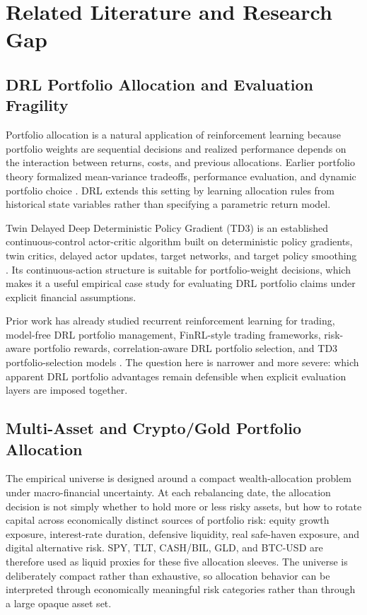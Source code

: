 \documentclass[11pt]{article}
\begin{document}
\section{Related Literature and Research Gap}

\subsection{DRL Portfolio Allocation and Evaluation Fragility}

Portfolio allocation is a natural application of reinforcement learning because portfolio weights are sequential decisions and realized performance depends on the interaction between returns, costs, and previous allocations. Earlier portfolio theory formalized mean-variance tradeoffs, performance evaluation, and dynamic portfolio choice \citep{markowitz1952,sharpe1966,merton1969,merton1971}. DRL extends this setting by learning allocation rules from historical state variables rather than specifying a parametric return model.

Twin Delayed Deep Deterministic Policy Gradient (TD3) is an established continuous-control actor-critic algorithm built on deterministic policy gradients, twin critics, delayed actor updates, target networks, and target policy smoothing \citep{silver2014,lillicrap2015,fujimoto2018}. Its continuous-action structure is suitable for portfolio-weight decisions, which makes it a useful empirical case study for evaluating DRL portfolio claims under explicit financial assumptions.

Prior work has already studied recurrent reinforcement learning for trading, model-free DRL portfolio management, FinRL-style trading frameworks, risk-aware portfolio rewards, correlation-aware DRL portfolio selection, and TD3 portfolio-selection models \citep{moody2001,jiang2017,almahdi2017,liu2020finrl,zhao2023correlation,jiang2024td3,jiang2025multiperiod}. The question here is narrower and more severe: which apparent DRL portfolio advantages remain defensible when explicit evaluation layers are imposed together.

\subsection{Multi-Asset and Crypto/Gold Portfolio Allocation}

The empirical universe is designed around a compact wealth-allocation problem under macro-financial uncertainty. At each rebalancing date, the allocation decision is not simply whether to hold more or less risky assets, but how to rotate capital across economically distinct sources of portfolio risk: equity growth exposure, interest-rate duration, defensive liquidity, real safe-haven exposure, and digital alternative risk. SPY, TLT, CASH/BIL, GLD, and BTC-USD are therefore used as liquid proxies for these five allocation sleeves. The universe is deliberately compact rather than exhaustive, so allocation behavior can be interpreted through economically meaningful risk categories rather than through a large opaque asset set.
\end{document}
